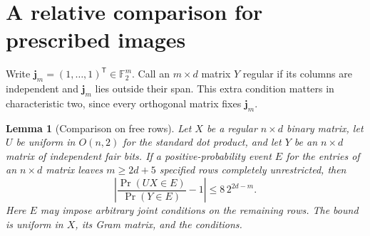 \documentclass[11pt]{article}
\newtheorem{lemma}[theorem]{Lemma}
\theoremstyle{remark}\newtheorem*{remark}{Remark}
\begin{document}
\section{A relative comparison for prescribed images}\label{sec:fibre}

Write $\mathbf j_m=(1,\ldots,1)^{\mathsf T}\in\mathbb F_2^m$. Call an
$m\times d$ matrix $Y$ regular if its columns are independent and
$\mathbf j_m$ lies outside their span. This extra condition matters in
characteristic two, since every orthogonal matrix fixes $\mathbf j_m$.

\begin{lemma}[Comparison on free rows]\label{lem:fibre}
Let $X$ be a regular $n\times d$ binary matrix, let $U$ be uniform in
$O(n,2)$ for the standard dot product, and let $Y$ be an $n\times d$
matrix of independent fair bits. If a positive-probability event $E$ for
the entries of an $n\times d$ matrix leaves $m\ge 2d+5$ specified rows
completely unrestricted, then
\[
 \left|\frac{\Pr(UX\in E)}{\Pr(Y\in E)}-1\right|
 \le 8\,2^{2d-m}.
\]
Here $E$ may impose arbitrary joint conditions on the remaining rows. The
bound is uniform in $X$, its Gram matrix, and the conditions.
\end{lemma}
\end{document}
